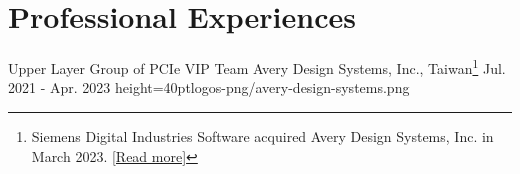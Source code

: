 \documentclass{cvclass}
\begin{document}
\makeinfo


\section{Professional Experiences}

    {Upper Layer Group of PCIe VIP Team}
    {Avery Design Systems, Inc., Taiwan\footnote{Siemens Digital Industries Software acquired Avery Design Systems, Inc. in March 2023. \href{https://newsroom.sw.siemens.com/en-US/siemens-avery-design-systems/}{[Read more]}}}
    {Jul. 2021 - Apr. 2023} %
    {height=40pt}{logos-png/avery-design-systems.png}
\end{document}
